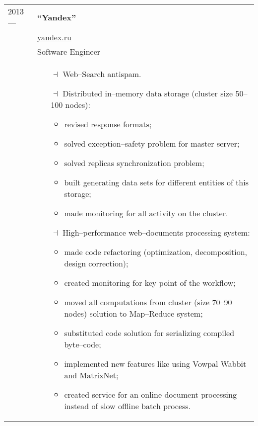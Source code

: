\documentclass[a4paper, 10pt]{article}
\begin{document}
\begin{longtable}{p{20mm}|p{140mm}}
2013 ---
& \textbf{``Yandex''} \\
& \href{https://yandex.ru/}{yandex.ru} \\
& Software Engineer \\
& \begin{itemize}[topsep = 0pt, itemsep = 0pt]
    \item[$\dashv$] Web--Search antispam.
    \item[$\dashv$] Distributed in--memory data storage (cluster size 50--100 nodes):
        \begin{itemize}[topsep = 0pt, itemsep = 0pt]
            \item revised response formats;
            \item solved exception--safety problem for master server;
            \item solved replicas synchronization problem;
            \item built generating data sets for different entities of this storage;
            \item made monitoring for all activity on the cluster.
        \end{itemize}
    \item[$\dashv$] High--performance web--documents processing system:
        \begin{itemize}[topsep = 0pt, itemsep = 0pt]
            \item made code refactoring (optimization, decomposition, design correction);
            \item created monitoring for key point of the workflow;
            \item moved all computations from cluster (size 70--90 nodes) solution to Map--Reduce system;
            \item substituted code solution for serializing compiled byte--code;
            \item implemented new features like using Vowpal Wabbit and MatrixNet;
            \item created service for an online document processing instead of slow offline batch process.
        \end{itemize}
\end{itemize}
\\


\end{longtable}
\end{document}
